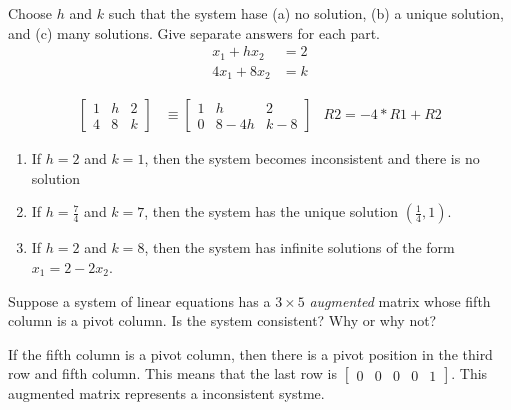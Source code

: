 \documentclass{mathhomework}
\begin{document}
\pagebreak
\begin{problem}[1.2\#19]
    Choose $h$ and $k$ such that the system hase (a) no solution, (b) a unique solution, and (c) many solutions. Give separate answers for each part.
    \begin{align*}
        x_1 + hx_2 &= 2 \\
        4x_1 + 8x_2 &= k
    \end{align*}

    \begin{solution}
        \begin{align*}
            \begin{bmatrix}
                1 & h & 2 \\
                4 & 8 & k
            \end{bmatrix}
            & \equiv
            \begin{bmatrix}
                1 & h & 2 \\
                0 & 8 - 4h & k - 8
            \end{bmatrix}
            & R2 = -4 * R1 + R2
        \end{align*}

        \begin{enumerate}[label=(\alph*)]
            \item If $h = 2$ and $k = 1$, then the system becomes inconsistent and there is no solution
            \item If $h = \frac{7}{4}$ and $k = 7$, then the system has the unique solution $(\frac{1}{4}, 1)$.
            \item If $h = 2$ and $k = 8$, then the system has infinite solutions of the form $x_1 = 2 - 2x_2$.
        \end{enumerate}
    \end{solution}
\end{problem}

\begin{problem}[1.2\#24]
    Suppose a system of linear equations has a $3 \times 5$ \textit{augmented} matrix whose fifth column is a pivot column. Is the system consistent? Why or why not?

    \begin{solution}
        If the fifth column is a pivot column, then there is a pivot position in the third row and fifth column. 
        This means that the last row is $\begin{bmatrix}
            0 & 0 & 0 & 0 & 1
        \end{bmatrix}$. This augmented matrix represents a inconsistent systme.
    \end{solution}    
\end{problem}
\end{document}
